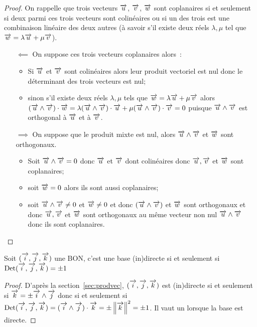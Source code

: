 \begin{proof}
  On rappelle que trois vecteurs $\vu$, $\vv$, $\vw$ sont coplanaires si et seulement si deux parmi ces trois vecteurs sont colinéaires ou si un des trois est une combinaison linéaire des deux autres (à savoir s'il existe deux réels $\lambda,\mu$ tel que $\vw=\lambda\vu+\mu\vv$).
  \begin{itemize}
  \item[$\impliedby$] On suppose ces trois vecteurs coplanaires alors~:
    \begin{itemize}
    \item Si $\vu$ et $\vv$ sont colinéaires alors leur produit vectoriel est nul donc le déterminant des trois vecteurs est nul;
    \item sinon s'il existe deux réels $\lambda,\mu$ tels que $\vw = \lambda\vu+\mu\vv$ alors $(\vu\wedge\vv)\cdot\vw=\lambda(\vu\wedge\vv)\cdot\vu+\mu(\vu\wedge\vv)\cdot\vv=0$ puisque $\vu\wedge\vv$ est orthogonal à $\vu$ et à $\vv$.
    \end{itemize}
  \item[$\implies$] On suppose que le produit mixte est nul, alors $\vu\wedge\vv$ et $\vw$ sont orthogonaux. 
    \begin{itemize}
    \item Soit $\vu\wedge\vv=0$ donc $\vu$ et $\vv$ dont colinéaires donc $\vu,\vv$ et $\vw$ sont coplanaires;
    \item soit $\vw=0$ alors ils sont aussi coplanaires;
    \item soit $\vu\wedge\vv \neq 0$ et $\vw\neq 0$ et donc $(\vu\wedge\vv)$ et $\vw$ sont \og orthogonaux \fg{} et donc $\vu,\vv$ et $\vw$ sont orthogonaux au même vecteur non nul $\vu\wedge\vv$ donc ils sont coplanaires.
    \end{itemize}
  \end{itemize}
\end{proof}
\begin{prop}
  Soit $\bondtrois$ une BON, c'est une base (in)directe si et seulement si $\Det\bondtrois=\pm 1$
\end{prop}
\begin{proof}
  D'après la section~\ref{sec:prodvec}, $\bondtrois$ est (in)directe si et seulement si $\vk=\pm\vi\wedge\vj$ donc si et seulement si $\Det\bondtrois=(\vi\wedge\vj)\cdot\vk=\pm\norme{\vk}^2=\pm 1$. Il vaut un lorsque la base est directe.
\end{proof}

